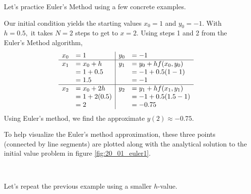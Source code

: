 Let's practice Euler's Method using a few concrete examples.\\

{Our initial condition yields the starting values $x_0 = 1$ and $y_0 = -1$.  With $h = 0.5,$ it takes $N=2$ steps to get to $x=2.$  Using steps 1 and 2 from the Euler's Method algorithm,
\[
\begin{array}{rl | rl}
x_0  &= 1			& 	y_0	&= -1\\ \hline
x_1 	&= x_0 + h 	& 	y_1 	&= y_0 + hf(x_0,y_0)\\
	&= 1 + 0.5	 	&		&= -1 + 0.5(1 - 1)\\
	&= 1.5		&		&= -1\\ \hline
x_2	&= x_0 + 2h	&	y_2	&= y_1 + hf(x_1,y_1)\\
	&= 1 + 2(0.5)	&		&= -1 + 0.5(1.5 -1)\\
	&= 2			&		&= -0.75
\end{array}
\]
Using Euler's method, we find the approximate $y(2) \approx -0.75.$

To help visualize the Euler's method approximation, these three points (connected by line segments) are plotted along with the analytical solution to the initial value problem in figure \ref{fig:20_01_euler1}.
}\\


Let's repeat the previous example using a smaller $h$-value.\\

